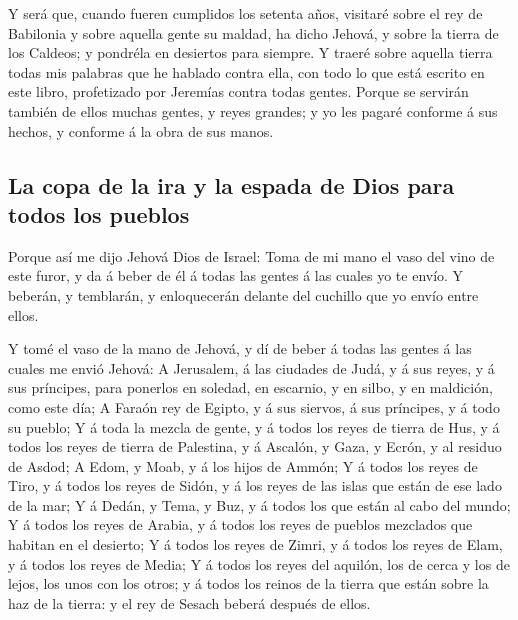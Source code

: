  Y será que, cuando fueren cumplidos los setenta años,
visitaré sobre el rey de Babilonia y sobre aquella gente su maldad, ha
dicho Jehová, y sobre la tierra de los Caldeos; y pondréla en desiertos
para siempre.  Y traeré sobre aquella tierra todas mis
palabras que he hablado contra ella, con todo lo que está escrito en
este libro, profetizado por Jeremías contra todas gentes.
 Porque se servirán también de ellos muchas gentes, y
reyes grandes; y yo les pagaré conforme á sus hechos, y conforme á la
obra de sus manos.

\hypertarget{la-copa-de-la-ira-y-la-espada-de-dios-para-todos-los-pueblos}{%
\subsection{La copa de la ira y la espada de Dios para todos los
pueblos}\label{la-copa-de-la-ira-y-la-espada-de-dios-para-todos-los-pueblos}}

 Porque así me dijo Jehová Dios de Israel: Toma de mi
mano el vaso del vino de este furor, y da á beber de él á todas las
gentes á las cuales yo te envío.  Y beberán, y temblarán,
y enloquecerán delante del cuchillo que yo envío entre ellos.

 Y tomé el vaso de la mano de Jehová, y dí de beber á
todas las gentes á las cuales me envió Jehová:  A
Jerusalem, á las ciudades de Judá, y á sus reyes, y á sus príncipes,
para ponerlos en soledad, en escarnio, y en silbo, y en maldición, como
este día;  A Faraón rey de Egipto, y á sus siervos, á sus
príncipes, y á todo su pueblo;  Y á toda la mezcla de
gente, y á todos los reyes de tierra de Hus, y á todos los reyes de
tierra de Palestina, y á Ascalón, y Gaza, y Ecrón, y al residuo de
Asdod;  A Edom, y Moab, y á los hijos de Ammón;
 Y á todos los reyes de Tiro, y á todos los reyes de
Sidón, y á los reyes de las islas que están de ese lado de la mar;
 Y á Dedán, y Tema, y Buz, y á todos los que están al
cabo del mundo;  Y á todos los reyes de Arabia, y á todos
los reyes de pueblos mezclados que habitan en el desierto;
 Y á todos los reyes de Zimri, y á todos los reyes de
Elam, y á todos los reyes de Media;  Y á todos los reyes
del aquilón, los de cerca y los de lejos, los unos con los otros; y á
todos los reinos de la tierra que están sobre la haz de la tierra: y el
rey de Sesach beberá después de ellos.

